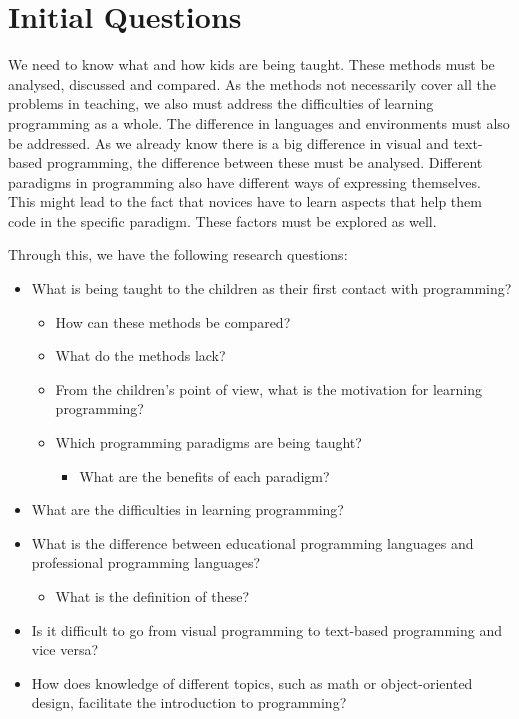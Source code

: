 \section{Initial Questions}
We need to know what and how kids are being taught. These methods must be analysed, discussed and compared. As the methods not necessarily cover all the problems in teaching, we also must address the difficulties of learning programming as a whole. The difference in languages and environments must also be addressed. As we already know there is a big difference in visual and text-based programming, the difference between these must be analysed. Different paradigms in programming also have different ways of expressing themselves. This might lead to the fact that novices have to learn aspects that help them code in the specific paradigm. These factors must be explored as well.

Through this, we have the following research questions:

\begin{itemize}
  \item What is being taught to the children as their first contact with programming?
  \begin{itemize}
    \item How can these methods be compared?
    \item What do the methods lack?
    \item From the children's point of view, what is the motivation for learning programming?
    \item Which programming paradigms are being taught?
    \begin{itemize}
      \item What are the benefits of each paradigm?
    \end{itemize}
  \end{itemize}
  \item What are the difficulties in learning programming?

  \item What is the difference between educational programming languages and professional programming languages?
  \begin{itemize}
    \item What is the definition of these?
  \end{itemize}
  \item Is it difficult to go from visual programming to text-based programming and vice versa?
  \item How does knowledge of different topics, such as math or object-oriented design, facilitate the introduction to programming?
\end{itemize}

